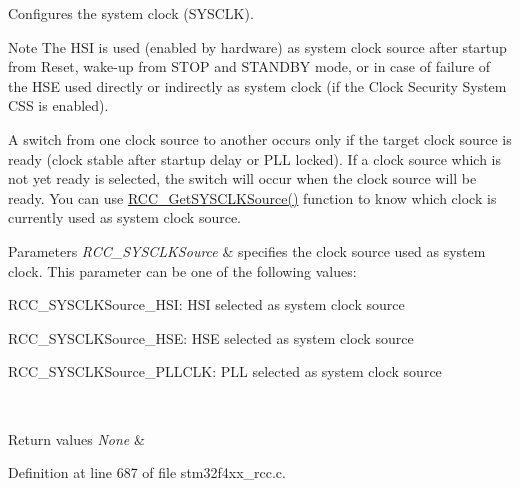 Configures the system clock (S\+Y\+S\+C\+LK). 

\begin{DoxyNote}{Note}
The H\+SI is used (enabled by hardware) as system clock source after startup from Reset, wake-\/up from S\+T\+OP and S\+T\+A\+N\+D\+BY mode, or in case of failure of the H\+SE used directly or indirectly as system clock (if the Clock Security System C\+SS is enabled). 

A switch from one clock source to another occurs only if the target clock source is ready (clock stable after startup delay or P\+LL locked). If a clock source which is not yet ready is selected, the switch will occur when the clock source will be ready. You can use \hyperlink{group___r_c_c___group2_gaaeb32311c208b2a980841c9c884a41ea}{R\+C\+C\+\_\+\+Get\+S\+Y\+S\+C\+L\+K\+Source()} function to know which clock is currently used as system clock source. 
\end{DoxyNote}

\begin{DoxyParams}{Parameters}
{\em R\+C\+C\+\_\+\+S\+Y\+S\+C\+L\+K\+Source} & specifies the clock source used as system clock. This parameter can be one of the following values\+: \begin{DoxyItemize}
\item R\+C\+C\+\_\+\+S\+Y\+S\+C\+L\+K\+Source\+\_\+\+H\+SI\+: H\+SI selected as system clock source \item R\+C\+C\+\_\+\+S\+Y\+S\+C\+L\+K\+Source\+\_\+\+H\+SE\+: H\+SE selected as system clock source \item R\+C\+C\+\_\+\+S\+Y\+S\+C\+L\+K\+Source\+\_\+\+P\+L\+L\+C\+LK\+: P\+LL selected as system clock source \end{DoxyItemize}
\\
\hline
\end{DoxyParams}

\begin{DoxyRetVals}{Return values}
{\em None} & \\
\hline
\end{DoxyRetVals}


Definition at line 687 of file stm32f4xx\+\_\+rcc.\+c.

\mbox{\label{group___r_c_c_gae0f15692614dd048ee4110a056f001dc}} 
